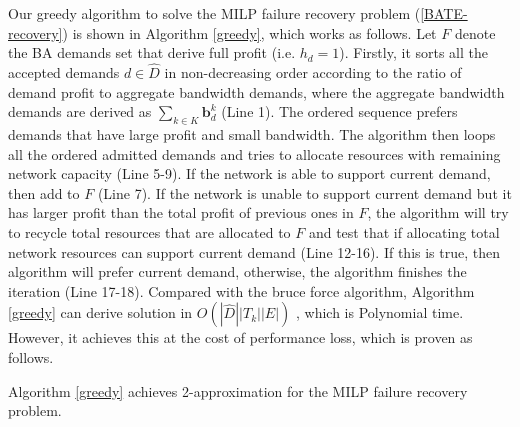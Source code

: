 \documentclass[sigconf]{acmart}
\begin{document}
\begin{appendices}
Our greedy algorithm to solve the MILP failure recovery problem (\ref{BATE-recovery}) 
is  shown in Algorithm \ref{greedy}, which works as follows. 
Let $F$ denote the BA demands set that derive full profit (i.e. $h_d=1$).
Firstly, it sorts all the accepted demands  $d\in \hat{D}$ in non-decreasing order according to the ratio of demand profit to aggregate bandwidth demands, where the aggregate bandwidth demands are derived as ${\sum_{k\in K}\mathbf{b}^k_d}$ (Line 1).
The ordered sequence prefers demands that have large profit and  small bandwidth.
The algorithm then loops all the ordered admitted demands and tries to allocate resources with remaining network capacity (Line 5-9).
If the network is able to support current demand, then add to $F$ (Line 7).
If the network is unable to support current demand  but  it has larger profit than the total profit of previous ones in $F$,  the algorithm will try to recycle total resources that are allocated to $F$ and test that if allocating total network resources can support current demand  (Line 12-16).
If this is true, then algorithm will prefer current demand, otherwise, the algorithm finishes the iteration (Line 17-18).
%
Compared with the bruce force algorithm, Algorithm \ref{greedy} can derive solution in $O(|\hat{D}||T_k||E|)$ , which is Polynomial time.
However, it achieves this at the cost of performance loss, which is proven as follows.
\begin{lemma}\label{greedy-app}
Algorithm \ref{greedy} achieves 2-approximation for the MILP failure recovery problem.
\end{lemma}


\end{appendices}
\end{document}
